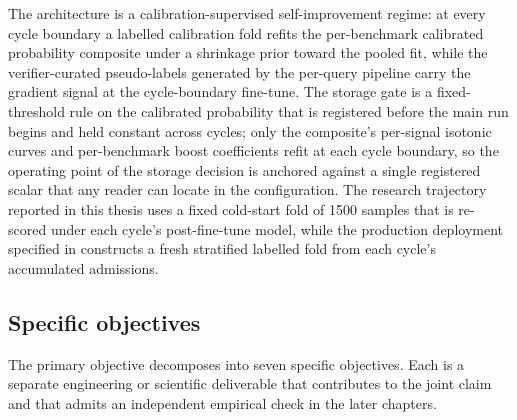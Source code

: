 The architecture is a calibration-supervised self-improvement regime: at every cycle boundary a labelled calibration fold refits the per-benchmark calibrated probability composite under a shrinkage prior toward the pooled fit, while the verifier-curated pseudo-labels generated by the per-query pipeline carry the gradient signal at the cycle-boundary fine-tune. The storage gate is a fixed-threshold rule on the calibrated probability that is registered before the main run begins and held constant across cycles; only the composite's per-signal isotonic curves and per-benchmark boost coefficients refit at each cycle boundary, so the operating point of the storage decision is anchored against a single registered scalar that any reader can locate in the configuration. The research trajectory reported in this thesis uses a fixed cold-start fold of 1500 samples that is re-scored under each cycle's post-fine-tune model, while the production deployment specified in  constructs a fresh stratified labelled fold from each cycle's accumulated admissions.

\subsection{Specific objectives}
\label{sec:specific-objectives}

The primary objective decomposes into seven specific objectives. Each is a separate engineering or scientific deliverable that contributes to the joint claim and that admits an independent empirical check in the later chapters.

